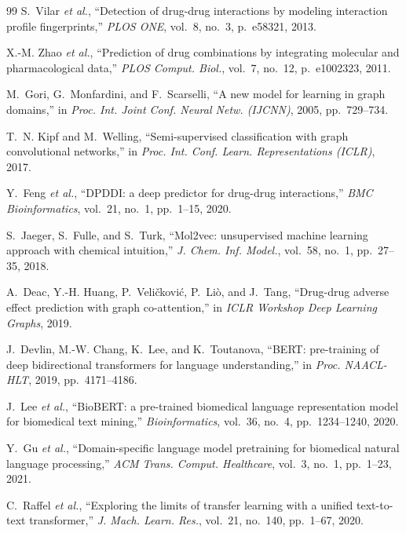 \documentclass[12pt,a4paper,oneside]{report}
\begin{document}
\begin{thebibliography}{99}
S.~Vilar \textit{et al.},
``Detection of drug-drug interactions by modeling interaction profile fingerprints,''
\textit{PLOS ONE}, vol.~8, no.~3, p.~e58321, 2013.

X.-M. Zhao \textit{et al.},
``Prediction of drug combinations by integrating molecular and pharmacological data,''
\textit{PLOS Comput. Biol.}, vol.~7, no.~12, p.~e1002323, 2011.

M.~Gori, G.~Monfardini, and F.~Scarselli,
``A new model for learning in graph domains,''
in \textit{Proc. Int. Joint Conf. Neural Netw. (IJCNN)}, 2005,
pp.~729--734.

T.~N. Kipf and M.~Welling,
``Semi-supervised classification with graph convolutional networks,''
in \textit{Proc. Int. Conf. Learn. Representations (ICLR)}, 2017.

Y.~Feng \textit{et al.},
``DPDDI: a deep predictor for drug-drug interactions,''
\textit{BMC Bioinformatics}, vol.~21, no.~1, pp.~1--15, 2020.

S.~Jaeger, S.~Fulle, and S.~Turk,
``Mol2vec: unsupervised machine learning approach with chemical intuition,''
\textit{J. Chem. Inf. Model.}, vol.~58, no.~1, pp.~27--35, 2018.

A.~Deac, Y.-H. Huang, P.~Veli\v{c}kovi\'c, P.~Li\`o, and J.~Tang,
``Drug-drug adverse effect prediction with graph co-attention,''
in \textit{ICLR Workshop Deep Learning Graphs}, 2019.

J.~Devlin, M.-W. Chang, K.~Lee, and K.~Toutanova,
``BERT: pre-training of deep bidirectional transformers for language understanding,''
in \textit{Proc. NAACL-HLT}, 2019, pp.~4171--4186.

J.~Lee \textit{et al.},
``BioBERT: a pre-trained biomedical language representation model for biomedical
text mining,''
\textit{Bioinformatics}, vol.~36, no.~4, pp.~1234--1240, 2020.

Y.~Gu \textit{et al.},
``Domain-specific language model pretraining for biomedical natural language processing,''
\textit{ACM Trans. Comput. Healthcare}, vol.~3, no.~1, pp.~1--23, 2021.

C.~Raffel \textit{et al.},
``Exploring the limits of transfer learning with a unified text-to-text transformer,''
\textit{J. Mach. Learn. Res.}, vol.~21, no.~140, pp.~1--67, 2020.


\end{thebibliography}
\end{document}
